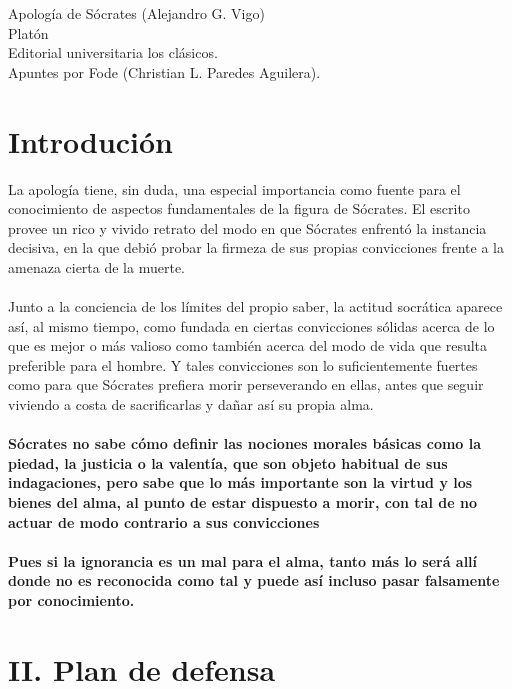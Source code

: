 \begin{center}
    \huge Apología de Sócrates (Alejandro G. Vigo)\\
    \vspace*{0.5cm}
    \large Platón\\
    Editorial universitaria los clásicos.\\
    \vspace{1cm}
    \Large Apuntes por Fode (Christian L. Paredes Aguilera).
    \vspace{1.5cm}
\end{center}

\section*{\center Introdución}

\begin{multicols}{2}

La apología tiene, sin duda, una especial importancia como fuente para el conocimiento de aspectos fundamentales de la figura de Sócrates. El escrito provee un rico y vivido retrato del modo en que Sócrates enfrentó la instancia decisiva, en la que debió probar la firmeza de sus propias convicciones frente a la amenaza cierta de la muerte. \\\\
Junto a la conciencia de los límites del propio saber, la actitud socrática aparece así, al mismo tiempo, como fundada en ciertas convicciones sólidas acerca de lo que es mejor o más valioso como también acerca del modo de vida que resulta preferible para el hombre. Y tales convicciones son lo suficientemente fuertes como para que Sócrates prefiera morir perseverando en ellas, antes que seguir viviendo a costa de sacrificarlas y dañar así su propia alma.\\\\
\textbf{Sócrates no sabe cómo definir las nociones morales básicas como la piedad, la justicia o la valentía, que son objeto habitual de sus indagaciones, pero sabe que lo más importante son la virtud y los bienes del alma, al punto de estar dispuesto a morir, con tal de no actuar de modo contrario a sus convicciones}\\\\

\textbf{Pues si la ignorancia es un mal para el alma, tanto más lo será allí donde no es reconocida como tal y puede así incluso pasar falsamente por conocimiento.}


\section*{\center II. Plan de defensa}


\end{multicols}
